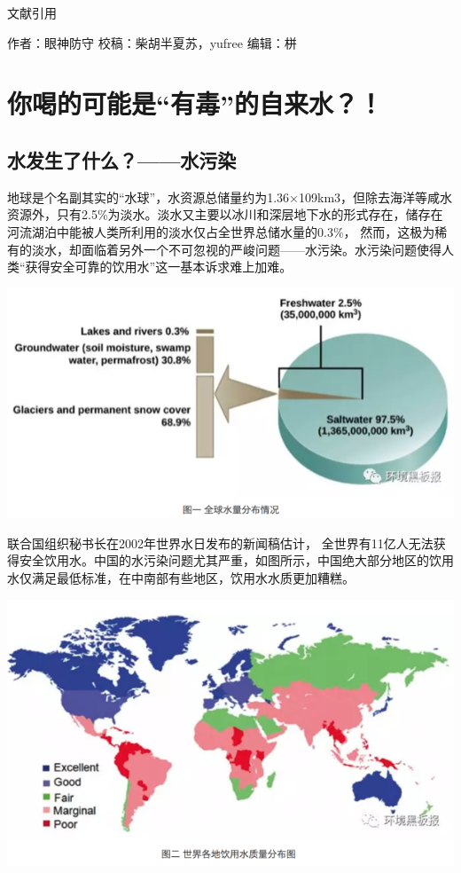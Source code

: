 \documentclass[]{book}
\begin{document}
文献引用

作者：眼神防守
校稿：柴胡半夏苏，yufree
编辑：栟

\hypertarget{ux4f60ux559dux7684ux53efux80fdux662fux6709ux6bd2ux7684ux81eaux6765ux6c34}{%
\section{你喝的可能是``有毒''的自来水？！}\label{ux4f60ux559dux7684ux53efux80fdux662fux6709ux6bd2ux7684ux81eaux6765ux6c34}}

\hypertarget{ux6c34ux53d1ux751fux4e86ux4ec0ux4e48ux6c34ux6c61ux67d3}{%
\subsection{水发生了什么？------水污染}\label{ux6c34ux53d1ux751fux4e86ux4ec0ux4e48ux6c34ux6c61ux67d3}}

地球是个名副其实的``水球''，水资源总储量约为1.36×109km3，但除去海洋等咸水资源外，只有2.5\%为淡水。淡水又主要以冰川和深层地下水的形式存在，储存在河流湖泊中能被人类所利用的淡水仅占全世界总储水量的0.3\%， 然而，这极为稀有的淡水，却面临着另外一个不可忽视的严峻问题------水污染。水污染问题使得人类``获得安全可靠的饮用水''这一基本诉求难上加难。

\includegraphics[width=8.33in]{images/dushui1}

联合国组织秘书长在2002年世界水日发布的新闻稿估计， 全世界有11亿人无法获得安全饮用水。中国的水污染问题尤其严重，如图所示，中国绝大部分地区的饮用水仅满足最低标准，在中南部有些地区，饮用水水质更加糟糕。

\includegraphics[width=8.33in]{images/dushui2}
\end{document}
